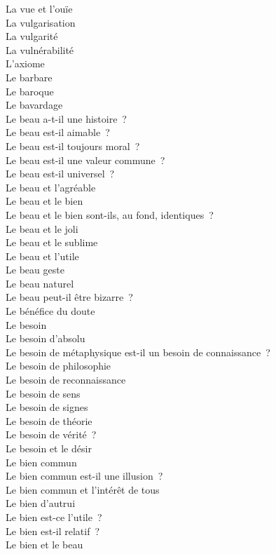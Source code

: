 \documentclass[a4paper,12pt]{article}
\begin{document}
La vue et l'ouïe \\
La vulgarisation \\
La vulgarité \\
La vulnérabilité \\
L'axiome \\
Le barbare \\
Le baroque \\
Le bavardage \\
Le beau a-t-il une histoire ? \\
Le beau est-il aimable ? \\
Le beau est-il toujours moral ? \\
Le beau est-il une valeur commune ? \\
Le beau est-il universel ? \\
Le beau et l'agréable \\
Le beau et le bien \\
Le beau et le bien sont-ils, au fond, identiques ? \\
Le beau et le joli \\
Le beau et le sublime \\
Le beau et l'utile \\
Le beau geste \\
Le beau naturel \\
Le beau peut-il être bizarre ? \\
Le bénéfice du doute \\
Le besoin \\
Le besoin d'absolu \\
Le besoin de métaphysique est-il un besoin de connaissance ? \\
Le besoin de philosophie \\
Le besoin de reconnaissance \\
Le besoin de sens \\
Le besoin de signes \\
Le besoin de théorie \\
Le besoin de vérité ? \\
Le besoin et le désir \\
Le bien commun \\
Le bien commun est-il une illusion ? \\
Le bien commun et l'intérêt de tous \\
Le bien d'autrui \\
Le bien est-ce l'utile ? \\
Le bien est-il relatif ? \\
Le bien et le beau \\
\end{document}
